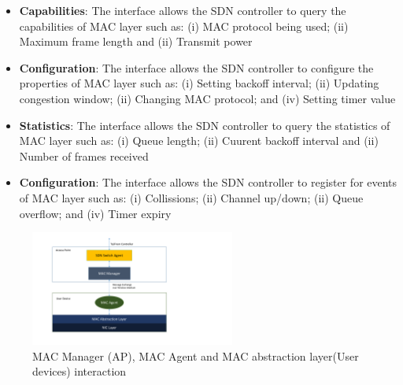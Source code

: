 \begin{itemize}
\item \textbf{Capabilities}: The interface allows the SDN controller to query the capabilities of MAC layer such as:
    (i) MAC protocol being used;
    (ii) Maximum frame length and
    (ii) Transmit power  
\item \textbf{Configuration}: The interface allows the SDN controller to configure the properties of MAC layer such as:
    (i) Setting backoff interval;
    (ii) Updating congestion window;
    (ii) Changing MAC protocol; and
    (iv) Setting timer value  
\item \textbf{Statistics}: The interface allows the SDN controller to query the statistics of MAC layer such as:
    (i) Queue length;
    (ii) Cuurent backoff interval and
    (ii) Number of frames received  
\item \textbf{Configuration}: The interface allows the SDN controller to register for events of MAC layer such as:
    (i) Collissions;
    (ii) Channel up/down;
    (ii) Queue overflow; and
    (iv) Timer expiry  
\end{itemize}

\begin{figure}[t]
  \centering
  \includegraphics[width=0.6\textwidth]{figures/communication.pdf}
  \caption{MAC Manager (AP), MAC Agent and MAC abstraction layer(User devices) interaction}
  \label{fig:topology}
\end{figure}

